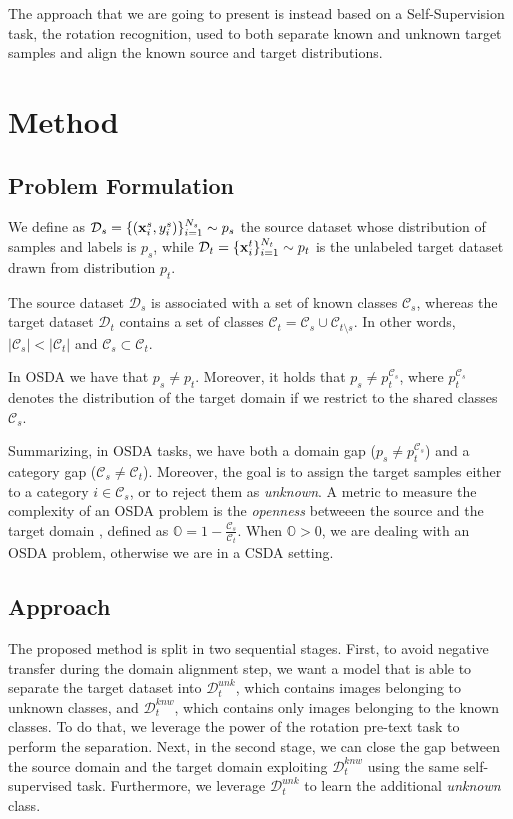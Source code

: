 \documentclass[10pt,twocolumn,letterpaper]{article}
\begin{document}
The approach that we are going to present is instead based on a Self-Supervision 
task, the rotation recognition, used to both separate known and unknown target 
samples and align the known source and target distributions.

\section{Method}
\label{sec:method}

\subsection{Problem Formulation}
\label{sec:problemformulation}
We define as $\mathcal{D}_s = \{({\bf x}_i^s, y_i^s)\}_{i=1}^{N_s} \sim p_s$ the source dataset whose distribution of samples and labels is $p_s$,
while $\mathcal{D}_t = \{{\bf x}_i^t\}_{i=1}^{N_t} \sim p_t$ is the unlabeled target dataset drawn from distribution $p_t$. 

The source dataset $\mathcal{D}_s$ is associated with a set of known classes $\mathcal{C}_s$,
whereas the target dataset $\mathcal{D}_t$ contains a set of classes $\mathcal{C}_t = \mathcal{C}_s \cup \mathcal{C}_{t \setminus s}$.
In other words,
$|\mathcal{C}_s| < |\mathcal{C}_t|$ and $\mathcal{C}_s \subset \mathcal{C}_t$. 

In OSDA we have that $p_s \neq p_t$.
Moreover, it holds that $p_s \neq p_t^{\mathcal{C}_s}$, where $p_t^{\mathcal{C}_s}$ denotes the distribution of the target domain if we restrict to
the shared classes $\mathcal{C}_s$. 

Summarizing, in OSDA tasks, we have both a domain gap ($p_s \neq p_t^{\mathcal{C}_s}$)
and a category gap ($\mathcal{C}_s \neq \mathcal{C}_t$). Moreover, the goal is to assign the target samples either to a category ${i \in \mathcal{C}_s}$,
or to reject them as {\it unknown}.
A metric to measure the complexity of an OSDA problem is the {\it openness} betweeen the source and the target domain \cite{bendale2015open}, 
defined as $\displaystyle \mathbb{O} = 1-\frac{\mathcal{C}_s}{\mathcal{C}_t}$.
When $\mathbb{O} > 0$, we are dealing with an OSDA problem, otherwise we are in a CSDA setting.

\subsection{Approach}
\label{sec:apporach}
The proposed method is split in two sequential stages. First, to avoid negative transfer during the domain alignment step, we want a model
that is able to separate the target dataset into $\mathcal{D}_t^{unk}$, which contains images belonging to unknown classes,
and $\mathcal{D}_t^{knw}$, which contains only images belonging to the known classes. To do that, we leverage the
power of the rotation pre-text task to perform the separation.
Next, in the second stage, we can close the gap between the source domain and the target domain exploiting $\mathcal{D}_t^{knw}$
using the same self-supervised task. Furthermore, we leverage $\mathcal{D}_t^{unk}$ to learn the additional {\it unknown} class.
\end{document}
